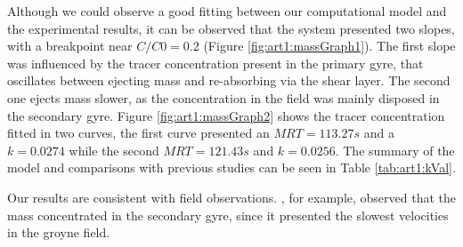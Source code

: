 Although we could observe a good fitting between our computational model and the experimental results, it can be observed that the system presented two slopes, with a breakpoint near $C/C0 = 0.2$ (Figure \ref{fig:art1:massGraph1}). The first slope was influenced by the tracer concentration present in the primary gyre, that oscillates between ejecting mass and re-absorbing via the shear layer. The second one ejects mass slower, as the concentration in the field was mainly disposed in the secondary gyre. Figure \ref{fig:art1:massGraph2} shows the tracer concentration fitted in two curves, the first curve presented an $MRT = 113.27s$ and a $k = 0.0274$ while the second $MRT = 121.43s$ and $k = 0.0256$. The summary of the model and comparisons with previous studies can be seen in Table \ref{tab:art1:kVal}.

Our results are consistent with field observations. \textcite{sukhodolov2014}, for example, observed that the mass concentrated in the secondary gyre, since it presented the slowest velocities in the groyne field.

